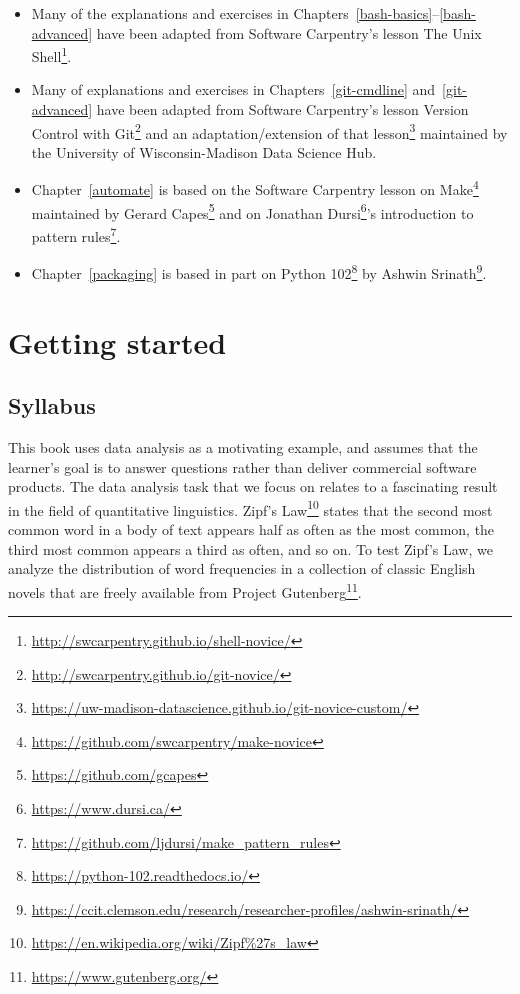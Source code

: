 \documentclass[
]{krantz}
\renewcommand{\href}[2]{#2\footnote{\url{#1}}}
\begin{document}
\begin{itemize}
\item
  Many of the explanations and exercises in Chapters~\ref{bash-basics}--\ref{bash-advanced}
  have been adapted from Software Carpentry's lesson
  \href{http://swcarpentry.github.io/shell-novice/}{The Unix Shell}.
\item
  Many of explanations and exercises in Chapters~\ref{git-cmdline} and~\ref{git-advanced}
  have been adapted from Software Carpentry's lesson
  \href{http://swcarpentry.github.io/git-novice/}{Version Control with Git} and an
  \href{https://uw-madison-datascience.github.io/git-novice-custom/}{adaptation/extension of that lesson} maintained by
  the University of Wisconsin-Madison Data Science Hub.
\item
  Chapter~\ref{automate} is based on the \href{https://github.com/swcarpentry/make-novice}{Software Carpentry lesson on Make}
  maintained by \href{https://github.com/gcapes}{Gerard Capes}
  and on \href{https://www.dursi.ca/}{Jonathan Dursi}'s
  \href{https://github.com/ljdursi/make_pattern_rules}{introduction to pattern rules}.
\item
  Chapter~\ref{packaging} is based in part on \href{https://python-102.readthedocs.io/}{Python 102}
  by \href{https://ccit.clemson.edu/research/researcher-profiles/ashwin-srinath/}{Ashwin Srinath}.
\end{itemize}

\hypertarget{getting-started}{%
\chapter{Getting started}\label{getting-started}}

\hypertarget{intro-syllabus}{%
\section{Syllabus}\label{intro-syllabus}}

This book uses data analysis as a motivating example,
and assumes that the learner's goal is to answer questions
rather than deliver commercial software products.
The data analysis task that we focus on
relates to a fascinating result in the field of quantitative linguistics.
\href{https://en.wikipedia.org/wiki/Zipf\%27s_law}{Zipf's Law} states that the second most common word in a body of text
appears half as often as the most common,
the third most common appears a third as often, and so on.
To test Zipf's Law,
we analyze the distribution of word frequencies
in a collection of classic English novels
that are freely available from \href{https://www.gutenberg.org/}{Project Gutenberg}.
\end{document}

